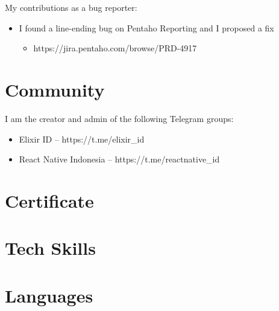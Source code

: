 \documentclass[11pt,a4paper,sans]{moderncv} %
\begin{document}
{
My contributions as a bug reporter:
\begin{itemize}
    \item I found a line-ending bug on Pentaho Reporting and I proposed a fix
    \begin{itemize}
        \item https://jira.pentaho.com/browse/PRD-4917
    \end{itemize}
\end{itemize}
}

\section{Community}
\cvitem{}
{
I am the creator and admin of the following Telegram groups:
\begin{itemize}
    \item Elixir ID -- https://t.me/elixir\_id
    \item React Native Indonesia -- https://t.me/reactnative\_id
\end{itemize}
}

\section{Certificate}


\section{Tech Skills}




\section{Languages}
\begin{small}
\end{small}
\end{document}
